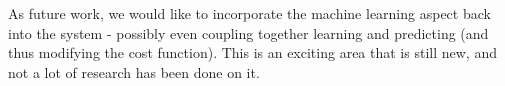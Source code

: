 \documentclass[12pt]{article}
\begin{document}
As future work, we would like to incorporate the machine learning aspect back
into the system - possibly even coupling together learning and predicting (and
thus modifying the cost function). This is an exciting area that is still new,
and not a lot of research has been done on it.

\clearpage



\end{document}
